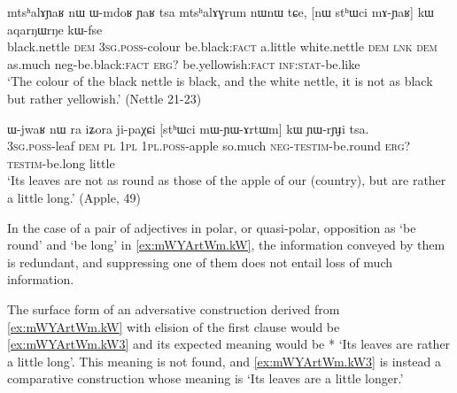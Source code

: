 \documentclass[oldfontcommands,oneside,a4paper,11pt]{article}
\newcommand{\ipa}[1]{{\phon #1}} %
\begin{document}
        \begin{exe}
  \ex  \label{ex:mAYaR.kW}  
  \gll 
  \ipa{mtsʰalɤɲaʁ} 	\ipa{nɯ} 	\ipa{ɯ-mdoʁ} 	\ipa{ɲaʁ} 	\ipa{tsa} 	\ipa{mtsʰalɤɣrum} 	\ipa{nɯnɯ} 	\ipa{tɕe,} 	[\ipa{nɯ} \ipa{stʰɯci} 	\ipa{mɤ-ɲaʁ}] 	\ipa{kɯ}   	\ipa{aqarŋɯrŋe} 	\ipa{kɯ-fse} 	\\
  black.nettle \textsc{dem} \textsc{3sg.poss}-colour be.black:\textsc{fact} a.little   white.nettle \textsc{dem} \textsc{lnk} \textsc{dem} as.much neg-be.black:\textsc{fact}  \textsc{erg?} be.yellowish:\textsc{fact} \textsc{inf:stat}-be.like \\
  \glt `The colour of the black nettle is black, and the white nettle, it is not as  black but rather yellowish.'   (Nettle 21-23)
        \end{exe}
        
           \begin{exe}
  \ex  \label{ex:mWYArtWm.kW}  
  \gll      
\ipa{ɯ-jwaʁ} 	\ipa{nɯ} \ipa{ra} 	\ipa{iʑora} 	\ipa{ji-paχɕi} 	[\ipa{stʰɯci} 	\ipa{mɯ-ɲɯ-ɤrtɯm}] 	\ipa{kɯ} 	\ipa{ɲɯ-rɲɟi} 	\ipa{tsa.} \\
\textsc{3sg.poss}-leaf \textsc{dem} \textsc{pl} \textsc{1pl} \textsc{1pl.poss}-apple so.much \textsc{neg-testim}-be.round \textsc{erg?} \textsc{testim}-be.long little \\
\glt `Its leaves  are not as round as those of the apple of our (country), but are rather a little long.'
(Apple, 49)
          \end{exe} 
 
% 
          
          In the case of a pair of adjectives in polar, or quasi-polar, opposition as `be round' and  `be long' in \ref{ex:mWYArtWm.kW}, the information conveyed by them is redundant, and suppressing one of them does not entail loss of much information.   
          
          The surface form of an adversative construction derived from \ref{ex:mWYArtWm.kW}  with elision  of the first clause would be  \ref{ex:mWYArtWm.kW3}  and its expected meaning would be * `Its leaves are  rather a little long'.   This meaning is not found, and \ref{ex:mWYArtWm.kW3}   is instead a comparative construction whose meaning is `Its leaves are a little longer.' 
            
\end{document}
